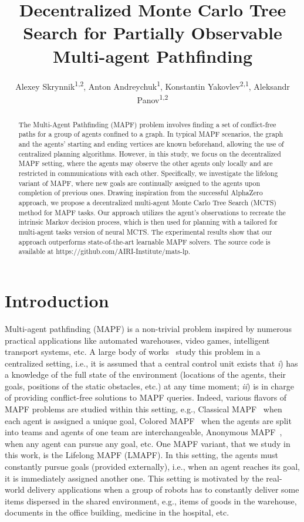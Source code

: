\documentclass[letterpaper]{article} %
\title{Decentralized Monte Carlo Tree Search for Partially Observable Multi-agent Pathfinding}
\author {
    Alexey Skrynnik\textsuperscript{\rm 1,2}, 
    Anton Andreychuk\textsuperscript{\rm 1},
    Konstantin Yakovlev\textsuperscript{\rm 2,1},
    Aleksandr Panov\textsuperscript{\rm 1,2}
}
\begin{document}
\maketitle


\begin{abstract}
  The Multi-Agent Pathfinding (MAPF) problem involves finding a set of conflict-free paths for a group of agents confined to a graph. In typical MAPF scenarios, the graph and the agents' starting and ending vertices are known beforehand, allowing the use of centralized planning algorithms. However, in this study, we focus on the decentralized MAPF setting, where the agents may observe the other agents only locally and are restricted in communications with each other. Specifically, we investigate the lifelong variant of MAPF, where new goals are continually assigned to the agents upon completion of previous ones. Drawing inspiration from the successful AlphaZero approach, we propose a decentralized multi-agent Monte Carlo Tree Search (MCTS) method for MAPF tasks. Our approach utilizes the agent's observations to recreate the intrinsic Markov decision process, which is then used for planning with a tailored for multi-agent tasks version of neural MCTS. The experimental results show that our approach outperforms state-of-the-art learnable MAPF solvers. The source code is available at https://github.com/AIRI-Institute/mats-lp.
\end{abstract}


\section{Introduction}
\label{sec:intro}

Multi-agent pathfinding (MAPF) is a non-trivial problem inspired by numerous practical applications like automated warehouses, video games, intelligent transport systems, etc. A large body of works~\cite{ma2019searching,sharon2015conflict,Wagner2011} study this problem in a centralized setting, i.e., it is assumed that a central control unit exists that \emph{i}) has a knowledge of the full state of the environment (locations of the agents, their goals, positions of the static obstacles, etc.) at any time moment; \emph{ii}) is in charge of providing conflict-free solutions to MAPF queries. Indeed, various flavors of MAPF problems are studied within this setting, e.g., Classical MAPF~\cite{stern2019multi} when each agent is assigned a unique goal, Colored MAPF~\cite{ma2016optimal} when the agents are split into teams and agents of one team are interchangeable, Anonymous MAPF~\cite{honig2018conflict}, when any agent can pursue any goal, etc. One MAPF variant, that we study in this work, is the Lifelong MAPF (LMAPF). In this setting, the agents must constantly pursue goals (provided externally), i.e., when an agent reaches its goal, it is immediately assigned another one. This setting is motivated by the real-world delivery applications when a group of robots has to constantly deliver some items dispersed in the shared environment, e.g., items of goods in the warehouse, documents in the office building, medicine in the hospital, etc.
\end{document}
